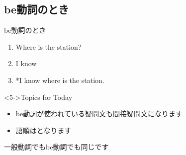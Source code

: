\documentclass[aspectratio=169,xcolor={dvipsnames,table}]{beamer}
\begin{document}
\subsection{be動詞のとき}
\begin{frame}[plain]{be動詞のとき}
 \begin{enumerate}
  \item<1-> Where is the station?
  \item<2-> I know 
  \item<4-> *I know where is the station.
 \end{enumerate}

\begin{block}<5->{Topics for Today}\small
\begin{itemize}[square]\small
 \item be動詞が使われている疑問文も間接疑問文になります
 \item 語順はとなります
\end{itemize}
\hfill{\scriptsize 一般動詞でもbe動詞でも同じです}
\end{block}
\mbox{}\hfill{\scriptsize {}}

\end{frame}
\end{document}
